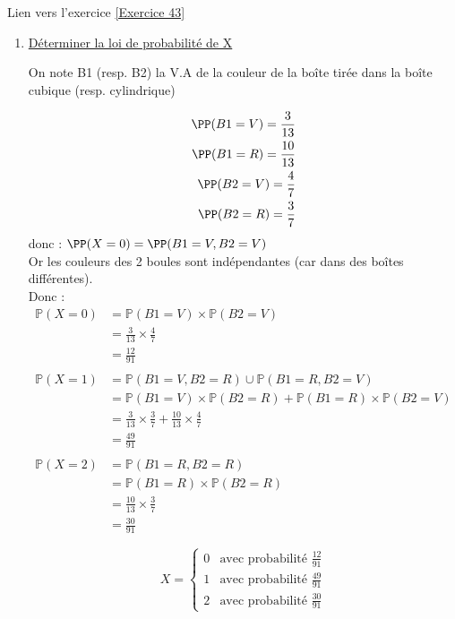 \documentclass[12pt,fleqn]{report} %
\begin{document}
\begin{correction}Lien vers l'exercice   \ref{Exercice 43}
	\begin{enumerate}
		\item \underline{Déterminer la loi de probabilité de X} 
		
		On note B1 (resp. B2) la V.A de la couleur de la boîte tirée dans la boîte cubique (resp. cylindrique)
		
		\begin{align*}
		\PP(B1 = V)=\frac{3}{13}\\
		\PP(B1 = R)=\frac{10}{13}\\
		\PP(B2 = V)=\frac{4}{7}\\
		\PP(B2 = R)=\frac{3}{7}
		\end{align*}
		donc :
		$\PP (X=0)= \PP (B1= V, B2=V)$\\
		Or les couleurs des 2 boules sont indépendantes (car dans des boîtes différentes).\\
		Donc :
		\begin{align*}
		\mathbb{P} (X=0) & = \mathbb{P}(B1=V) \times \mathbb{P} (B2=V)\\
		& = \frac{3}{13}\times\frac{4}{7}\\
		& = \frac{12}{91}\\
		\\
		\mathbb{P} (X=1) & = \mathbb{P}(B1=V, B2=R) \cup \mathbb{P} (B1=R, B2=V)\\
		& = \mathbb{P}(B1=V) \times \mathbb{P}(B2=R) + \mathbb{P} (B1=R)\times \mathbb{P} (B2=V)\\
		& = \frac{3}{13}\times\frac{3}{7}+ \frac{10}{13}\times \frac{4}{7}\\
		& = \frac{49}{91}\\
		\\ 
		\mathbb{P}(X=2) & = \mathbb{P}(B1=R, B2=R) \\
		& = \mathbb{P}(B1=R) \times \mathbb{P}(B2=R)\\
		& = \frac{10}{13}\times\frac{3}{7}\\
		& = \frac{30}{91}
		\end{align*}
		
		\begin{equation*}
		X = \left \{ \begin{array}{ll}
		0 & \text{avec probabilité } \frac{12}{91} \\
		1 & \text{avec probabilité }\frac{49}{91}\\
		2 & \text{avec probabilité }\frac{30}{91}
		\end{array}
		\right.
		\end{equation*}
		

\end{enumerate}
\end{correction}
\end{document}
